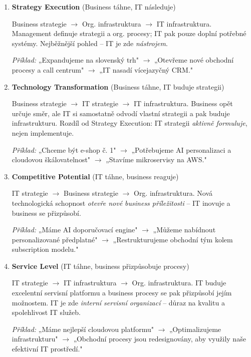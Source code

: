 \begin{enumerate}
  \item \textbf{Strategy Execution} (Business táhne, IT následuje)

    Business strategie $\to$ Org. infrastruktura $\to$ IT infrastruktura.
    Management definuje strategii a org. procesy; IT pak pouze doplní potřebné systémy.
    Nejběžnější pohled -- IT je zde \textit{nástrojem}.

    \textit{Příklad:} „Expandujeme na slovenský trh" $\to$ „Otevřeme nové obchodní procesy a call centrum"
    $\to$ „IT nasadí vícejazyčný CRM."

  \item \textbf{Technology Transformation} (Business táhne, IT buduje strategii)

    Business strategie $\to$ IT strategie $\to$ IT infrastruktura.
    Business opět určuje směr, ale IT si samostatně odvodí vlastní strategii a pak buduje infrastrukturu.
    Rozdíl od Strategy Execution: IT strategii \textit{aktivně formuluje}, nejen implementuje.

    \textit{Příklad:} „Chceme být e-shop č. 1" $\to$ „Potřebujeme AI personalizaci a cloudovou škálovatelnost"
    $\to$ „Stavíme mikroservisy na AWS."

  \item \textbf{Competitive Potential} (IT táhne, business reaguje)

    IT strategie $\to$ Business strategie $\to$ Org. infrastruktura.
    Nová technologická schopnost \textit{otevře nové business příležitosti} -- IT inovuje a business se přizpůsobí.

    \textit{Příklad:} „Máme AI doporučovací engine" $\to$ „Můžeme nabídnout personalizované předplatné"
    $\to$ „Restrukturujeme obchodní tým kolem subscription modelu."

  \item \textbf{Service Level} (IT táhne, business přizpůsobuje procesy)

    IT strategie $\to$ IT infrastruktura $\to$ Org. infrastruktura.
    IT buduje excelentní servisní platformu a business procesy se pak přizpůsobí jejím možnostem.
    IT je zde \textit{interní servisní organizací} -- důraz na kvalitu a spolehlivost IT služeb.

    \textit{Příklad:} „Máme nejlepší cloudovou platformu" $\to$ „Optimalizujeme infrastrukturu"
    $\to$ „Obchodní procesy jsou redesignovány, aby využily naše efektivní IT prostředí."
\end{enumerate}

